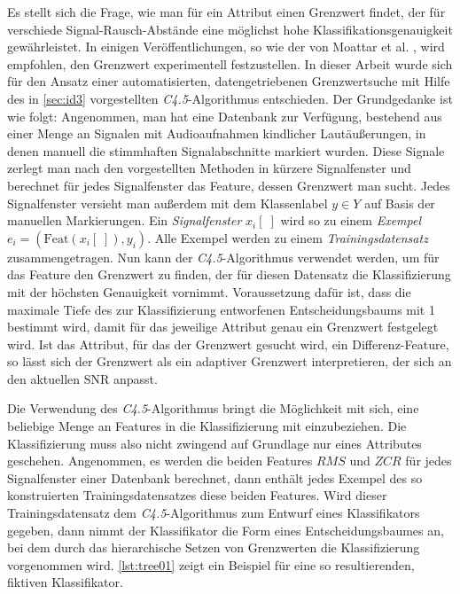 Es stellt sich die Frage, wie man für ein Attribut einen Grenzwert findet, der für verschiede Signal-Rausch-Abstände eine möglichst hohe Klassifikationsgenauigkeit gewährleistet. In einigen Veröffentlichungen, so wie der von Moattar et al. \cite{vad_Easy}, wird empfohlen, den Grenzwert experimentell festzustellen. In dieser Arbeit wurde sich für den Ansatz einer automatisierten, datengetriebenen Grenzwertsuche mit Hilfe des in \autoref{sec:id3} vorgestellten \emph{C4.5}-Algorithmus entschieden. Der Grundgedanke ist wie folgt: Angenommen, man hat eine Datenbank zur Verfügung, bestehend aus einer Menge an Signalen mit Audioaufnahmen kindlicher Lautäußerungen, in denen manuell die stimmhaften Signalabschnitte markiert wurden. Diese Signale zerlegt man nach den vorgestellten Methoden in kürzere Signalfenster und berechnet für jedes Signalfenster das Feature, dessen Grenzwert man sucht. Jedes Signalfenster versieht man außerdem mit dem Klassenlabel $y \in Y$ auf Basis der manuellen Markierungen. Ein \emph{Signalfenster} $x_i[\;]$ wird so zu einem \emph{Exempel} $e_i = (\text{Feat}(x_i[\;]), y_i)$. Alle Exempel werden zu einem \emph{Trainingsdatensatz} zusammengetragen. Nun kann der \emph{C4.5}-Algorithmus verwendet werden, um für das Feature den Grenzwert zu finden, der für diesen Datensatz die Klassifizierung mit der höchsten Genauigkeit vornimmt. Voraussetzung dafür ist, dass die maximale Tiefe des zur Klassifizierung entworfenen Entscheidungsbaums mit 1 bestimmt wird, damit für das jeweilige Attribut genau ein Grenzwert festgelegt wird. Ist das Attribut, für das der Grenzwert gesucht wird, ein Differenz-Feature, so lässt sich der Grenzwert als ein adaptiver Grenzwert interpretieren, der sich an den aktuellen SNR anpasst.

Die Verwendung des \emph{C4.5}-Algorithmus bringt die Möglichkeit mit sich, eine beliebige Menge an Features in die Klassifizierung mit einzubeziehen. Die Klassifizierung muss also nicht zwingend auf Grundlage nur eines Attributes geschehen. Angenommen, es werden die beiden Features $RMS$ und $ZCR$ für jedes Signalfenster einer Datenbank berechnet, dann enthält jedes Exempel des so konstruierten Trainingsdatensatzes diese beiden Features. Wird dieser Trainingsdatensatz dem \emph{C4.5}-Algorithmus zum Entwurf eines Klassifikators gegeben, dann nimmt der Klassifikator die Form eines Entscheidungsbaumes an, bei dem durch das hierarchische Setzen von Grenzwerten die Klassifizierung vorgenommen wird. \autoref{lst:tree01} zeigt ein Beispiel für eine so resultierenden, fiktiven Klassifikator.


